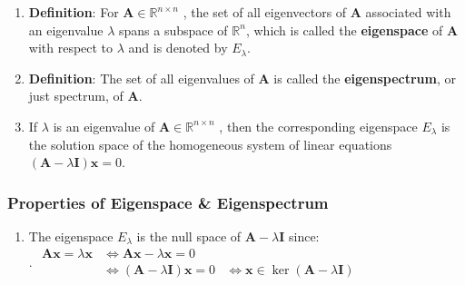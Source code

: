 \begin{enumerate}
    \item \textbf{Definition}: For $\bm{A} \in \mathbb{R}^{n\times n}$ , the set of all eigenvectors of $\bm{A}$ associated with an eigenvalue $\lambda $ spans a subspace of $\mathbb{R}^n$, which is called the \textbf{eigenspace} of $\bm{A}$ with respect to $\lambda $ and is denoted by $E_\lambda $.
    \hfill \cite{mfml/book/mml/Deisenroth-Faisal-Ong}

    \item \textbf{Definition}: The set of all eigenvalues of $\bm{A}$ is called the \textbf{eigenspectrum}, or just spectrum, of $\bm{A}$.
    \hfill \cite{mfml/book/mml/Deisenroth-Faisal-Ong}

    \item If $\lambda $ is an eigenvalue of $\bm{A} \in \mathbb{R}^{n\times n}$ , then the corresponding eigenspace $E_\lambda $ is the solution space of the homogeneous system of linear equations $(\bm{A} - \lambda \bm{I})\bm{x} = 0$.
    \hfill \cite{mfml/book/mml/Deisenroth-Faisal-Ong}
\end{enumerate}


\subsubsection{Properties of Eigenspace \& Eigenspectrum}

\begin{enumerate}
    \item The eigenspace $E_\lambda$  is the null space of $\bm{A} - \lambda \bm{I}$ since:
    \hfill \cite{mfml/book/mml/Deisenroth-Faisal-Ong}
    \\
    .\hfill
    $
        \begin{aligned}
            \bm{Ax} = \lambda \bm{x}
            & \Longleftrightarrow \bm{Ax} - \lambda \bm{x} = 0 \\
            & \Longleftrightarrow (\bm{A} - \lambda \bm{I})\bm{x} = 0  
            & \Longleftrightarrow \bm{x} \in \ker(\bm{A} - \lambda \bm{I})
        \end{aligned}
    $
    \hfill \cite{mfml/book/mml/Deisenroth-Faisal-Ong}
\end{enumerate}






